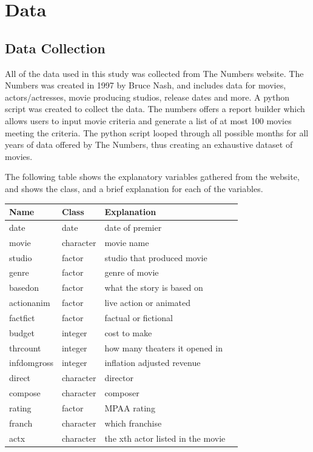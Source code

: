 \documentclass{svproc}
\begin{document}
\newpage
\section{Data}

\subsection{Data Collection} 

All of the data used in this study was collected from The Numbers website. The Numbers was created in 1997 by Bruce Nash, and includes data for movies, actors/actresses, movie producing studios, release dates and more. A python script was created to collect the data. The numbers offers a report builder which allows users to input movie criteria and generate a list of at most 100 movies meeting the criteria. The python script looped through all possible months for all years of data offered by The Numbers, thus creating an exhaustive dataset of movies.

The following table shows the explanatory variables gathered from the website, and shows the class, and a brief explanation for each of the variables.

\begin{table}[ht]
\centering
\begin{tabular}{llll}
  \hline
 Name & Class & Explanation \\ 
  \hline
date & date & date of premier \\ 
  movie & character & movie name \\ 
  studio & factor & studio that produced movie \\ 
  genre & factor & genre of movie \\ 
  basedon & factor & what the story is based on \\ 
  actionanim & factor & live action or animated \\ 
  factfict & factor & factual or fictional \\ 
   budget & integer & cost to make \\ 
  thrcount & integer & how many theaters it opened in \\ 
   infdomgross & integer & inflation adjusted revenue \\ 
   direct & character & director \\ 
   compose & character & composer \\ 
   rating & factor & MPAA rating \\ 
   franch & character & which franchise \\ 
   actx & character & the xth actor listed in the movie \\ 
   \hline
\end{tabular}
\end{table}
\end{document}

